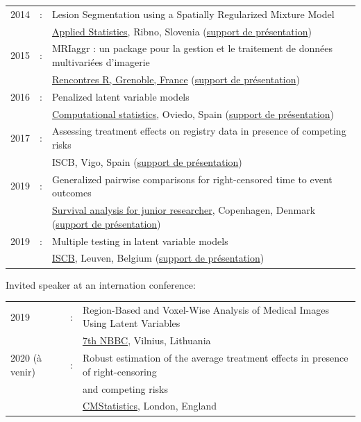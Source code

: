 \documentclass[12pt]{article}
\begin{document}
\begin{tabular}{l@{ }l@{ }l}
2014 &:& Lesion Segmentation using a Spatially Regularized Mixture Model \\
&& \href{http://conferences.nib.si/AS2014/default.htm}{Applied Statistics}, Ribno, Slovenia \hfill (\href{https://bozenne.github.io/doc/Talks/2014-Applied_statistics-Lesion_Segmentation.pdf}{support de présentation}) \\ [3mm]
2015 &:& MRIaggr : un package pour la gestion et le traitement de données multivariées d'imagerie\\
&& \href{https://r2015-grenoble.sciencesconf.org/66037}{Rencontres R, Grenoble, France}  \hfill   (\href{https://bozenne.github.io/doc/Talks/2015-R-MRIaggr.pdf}{support de présentation})  \\ [3mm]
2016 &:& Penalized latent variable models  \\
&& \href{http://cmstatistics.org/RegistrationsV2/COMPSTAT2016/viewSubmission.php?in=440&token=29584n1s18p97n65o7p1r5n36sopq0n4}{Computational statistics}, Oviedo, Spain \hfill (\href{https://bozenne.github.io/doc/Talks/2016-Compstat-pLVM.pdf}{support de présentation}) \\ [3mm]
2017 &:& Assessing treatment effects on registry data in presence of competing risks \\ 
&& ISCB, Vigo, Spain \hfill (\href{https://bozenne.github.io/doc/Talks/2017-ISCB-ate.pdf}{support de présentation}) \\ [3mm]
2019 &:& Generalized pairwise comparisons for right-censored time to event outcomes \\
&& \href{https://publicifsv.sund.ku.dk/~safjr2019/}{Survival analysis for junior researcher}, Copenhagen, Denmark \hfill (\href{https://bozenne.github.io/doc/Talks/2019-prezSAfJR-GPC.pdf}{support de présentation}) \\ [3mm]
2019 &:& Multiple testing in latent variable models \\
&& \href{https://kuleuvencongres.be/iscb40/}{ISCB}, Leuven, Belgium \hfill (\href{https://bozenne.github.io/doc/Talks/2019-ISCB-multcomp_LVM.pdf}{support de présentation}) \\
\end{tabular}

\clearpage

Invited speaker at an internation conference: 

\medskip

\begin{tabular}{l@{ }l@{ }l}
2019 &:& Region-Based and Voxel-Wise Analysis of Medical Images Using Latent Variables \\
&& \href{https://events.razzby.com/nbbc19/}{7th NBBC}, Vilnius, Lithuania \\
2020 (à venir) &:& Robust estimation of the average treatment effects in presence of right-censoring \\
&& and competing risks \\
&& \href{http://www.cmstatistics.org/conferences.php}{CMStatistics}, London, England \\
\end{tabular}
\end{document}
